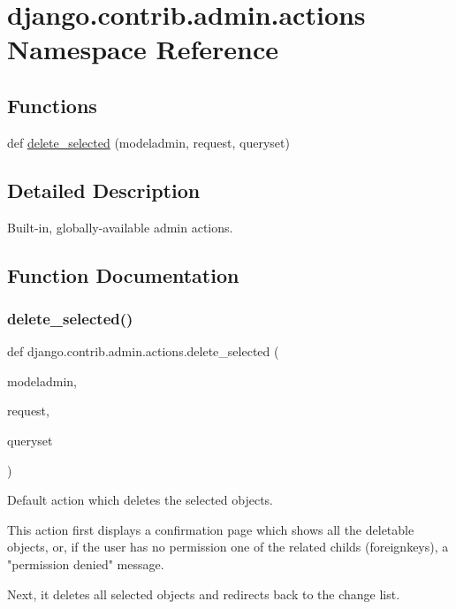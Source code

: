 \hypertarget{namespacedjango_1_1contrib_1_1admin_1_1actions}{}\section{django.\+contrib.\+admin.\+actions Namespace Reference}
\label{namespacedjango_1_1contrib_1_1admin_1_1actions}
\subsection*{Functions}
\begin{DoxyCompactItemize}
\item 
def \mbox{\hyperlink{namespacedjango_1_1contrib_1_1admin_1_1actions_a012bfc22d84aead20128657885a1dbf0}{delete\+\_\+selected}} (modeladmin, request, queryset)
\end{DoxyCompactItemize}


\subsection{Detailed Description}
\begin{DoxyVerb}Built-in, globally-available admin actions.
\end{DoxyVerb}
 

\subsection{Function Documentation}
\mbox{\label{namespacedjango_1_1contrib_1_1admin_1_1actions_a012bfc22d84aead20128657885a1dbf0}} 
\subsubsection{\texorpdfstring{delete\+\_\+selected()}{delete\_selected()}}
{\footnotesize\ttfamily def django.\+contrib.\+admin.\+actions.\+delete\+\_\+selected (\begin{DoxyParamCaption}\item[{}]{modeladmin,  }\item[{}]{request,  }\item[{}]{queryset }\end{DoxyParamCaption})}

\begin{DoxyVerb}Default action which deletes the selected objects.

This action first displays a confirmation page which shows all the
deletable objects, or, if the user has no permission one of the related
childs (foreignkeys), a "permission denied" message.

Next, it deletes all selected objects and redirects back to the change list.
\end{DoxyVerb}
 